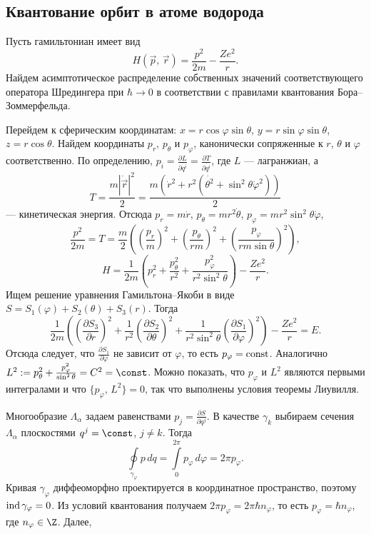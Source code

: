 \documentclass[a4paper
]{article}
\begin{document}
\subsection{Квантование орбит в атоме водорода}
Пусть гамильтониан имеет вид
$$H(\vec{p}, \, \vec{r})=\frac{p^2}{2m}-\frac{Ze^2}{r}.$$
Найдем асимптотическое распределение собственных значений соответствующего
оператора Шредингера при $\hbar\rightarrow 0$ в соответствии с правилами
квантования Бора--Зоммерфельда. \par
Перейдем к сферическим координатам: $x=r\cos \varphi\sin \theta$,
$y=r\sin \varphi\sin \theta$, $z=r\cos \theta$. Найдем координаты
$p_r$, $p_\theta$ и $p_\varphi$, канонически сопряженные к $r$, $\theta$
и $\varphi$ соответственно. По определению, $p_i=\frac{\partial L}
{\partial \dot{q^i}}=\frac{\partial T}{\partial \dot{q^i}}$, где $L$ ---
лагранжиан, а
$$T=\frac{m|\dot{\vec{r}}|^2}{2}=\frac{m(\dot{r}^2+r^2(\dot{\theta^2}+
\sin^2\theta\dot{\varphi}^2))}{2}$$
--- кинетическая энергия. Отсюда $p_r=m\dot{r}$, $p_\theta=mr^2\dot{\theta}$,
$p_{\varphi}=mr^2\sin^2\theta\dot{\varphi}$,
$$\frac{p^2}{2m}=T=\frac{m}{2}\left(\left(\frac{p_r}{m}\right)^2+
\left(\frac{p_\theta}{rm}\right)^2+\left(\frac{p_\varphi}{rm\sin\theta}
\right)^2\right),$$
$$H=\frac{1}{2m}\left(p_r^2+\frac{p_\theta^2}{r^2}+\frac{p_\varphi^2}
{r^2\sin^2\theta}\right)-\frac{Ze^2}{r}.$$
Ищем решение уравнения Гамильтона--Якоби в виде $S=S_1(\varphi)+S_2(\theta)+
S_3(r)$. Тогда $$\frac{1}{2m}\left(\left(\frac{\partial S_3}
{\partial r}\right)^2+\frac{1}{r^2}\left(\frac{\partial S_2}{\partial
\theta}\right)^2+\frac{1}{r^2\sin^2\theta}\left(\frac{\partial S_1}{\partial
\varphi}\right)^2\right)-\frac{Ze^2}{r}=E.$$
Отсюда следует, что $\frac{\partial S_1}{\partial \varphi}$ не зависит
от $\varphi$, то есть $p_{\varphi}={\rm const}$. Аналогично $L^2:=p_\theta^2+
\frac{p_\varphi^2}{\sin^2\theta}=C^2=\const$. Можно показать, что
$p_\varphi$ и $L^2$ являются первыми интегралами и что $\{p_\varphi, \,
L^2\}=0$, так что выполнены условия теоремы Лиувилля. \par
Многообразие $\Lambda_\alpha$ задаем равенствами $p_j=\frac{\partial S}
{\partial q^j}$. В качестве $\gamma_k$ выбираем сечения $\Lambda_\alpha$
плоскостями $q^j=\const$, $j\ne k$. Тогда $$\oint \limits_{\gamma_\varphi}
p \, dq=\int \limits _0^{2\pi}p_{\varphi}\, d\varphi=2\pi p_{\varphi}.$$
Кривая $\gamma_\varphi$ диффеоморфно проектируется в координатное
пространство, поэтому ${\rm ind}\, \gamma_\varphi=0$.
Из условий квантования получаем $2\pi p_\varphi=2\pi\hbar n_{\varphi}$,
то есть $p_\varphi=\hbar n_{\varphi}$, где $n_\varphi\in \Z$. Далее,
\end{document}
